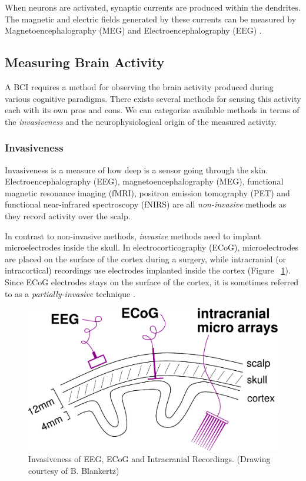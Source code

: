 \documentclass[12pt]{article}
\newcommand\mysubsection[1]{\subsection{#1}}
\newcommand\mysubsubsection[1]{\subsubsection{#1}}
\numberwithin{equation}{section}
\numberwithin{figure}{section}
\numberwithin{table}{section}
\begin{document}
\par{
    When neurons are activated, synaptic currents are produced within the dendrites.
    The magnetic and electric fields generated by these currents can be
    measured by Magnetoencephalography (MEG) and Electroencephalography (EEG) \citep{sanei_eeg_2008}.
}

\mysubsection{Measuring Brain Activity}\label{seq:brain_imaging}
\par{
    A BCI requires a method for observing the brain activity produced during
    various cognitive paradigms. There exists several methods for sensing
    this activity each with its own pros and cons. We can categorize available
    methods in terms of the \emph{invasiveness} and the neurophysiological
    origin of the measured activity.
}
\mysubsubsection{Invasiveness}\label{seq:invasiveness}
\par{
    Invasiveness is a measure of how deep is a sensor going through the skin.
    Electroencephalography (EEG), magnetoencephalography (MEG), functional magnetic
    resonance imaging (fMRI), positron emission tomography (PET) and functional near-infrared spectroscopy (fNIRS)
    are all \emph{non-invasive} methods as they record activity over the scalp.
}
\par{
    In contrast to non-invasive methods, \emph{invasive} methods need to implant
    microelectrodes inside the skull. In electrocorticography (ECoG), microelectrodes
    are placed on the surface of the cortex during a surgery, while intracranial (or
    intracortical) recordings use electrodes implanted inside the cortex (Figure ~\ref{fig:methods_eeg_ecog}).
    Since ECoG electrodes stays on the surface of the cortex, it is sometimes referred to as a
    \emph{partially-invasive} technique \citep{demetriades_brain-machine_2010}.

    \begin{figure}[ht]
        \centering
        \includegraphics[scale=0.5]{images/eeg_vs_ecog}
        \caption[Invasiveness of EEG, ECoG and Intracranial Recordings.]{Invasiveness of EEG, ECoG and Intracranial Recordings. (Drawing courtesy of B. Blankertz)}
        \label{fig:methods_eeg_ecog}
    \end{figure}
}
\end{document}

